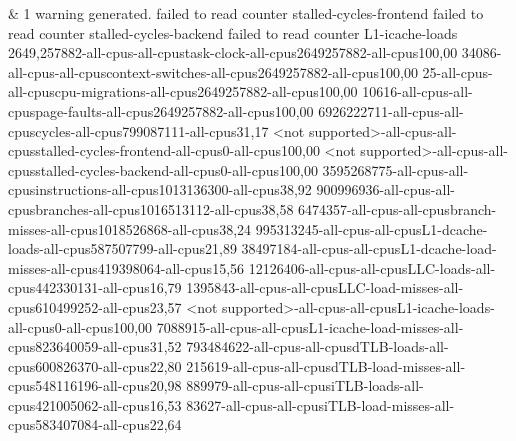 &
1 warning generated. failed to read counter stalled-cycles-frontend failed to read counter stalled-cycles-backend failed to read counter L1-icache-loads 2649,257882-all-cpus-all-cpustask-clock-all-cpus2649257882-all-cpus100,00 34086-all-cpus-all-cpuscontext-switches-all-cpus2649257882-all-cpus100,00 25-all-cpus-all-cpuscpu-migrations-all-cpus2649257882-all-cpus100,00 10616-all-cpus-all-cpuspage-faults-all-cpus2649257882-all-cpus100,00 6926222711-all-cpus-all-cpuscycles-all-cpus799087111-all-cpus31,17 <not supported>-all-cpus-all-cpusstalled-cycles-frontend-all-cpus0-all-cpus100,00 <not supported>-all-cpus-all-cpusstalled-cycles-backend-all-cpus0-all-cpus100,00 3595268775-all-cpus-all-cpusinstructions-all-cpus1013136300-all-cpus38,92 900996936-all-cpus-all-cpusbranches-all-cpus1016513112-all-cpus38,58 6474357-all-cpus-all-cpusbranch-misses-all-cpus1018526868-all-cpus38,24 995313245-all-cpus-all-cpusL1-dcache-loads-all-cpus587507799-all-cpus21,89 38497184-all-cpus-all-cpusL1-dcache-load-misses-all-cpus419398064-all-cpus15,56 12126406-all-cpus-all-cpusLLC-loads-all-cpus442330131-all-cpus16,79 1395843-all-cpus-all-cpusLLC-load-misses-all-cpus610499252-all-cpus23,57 <not supported>-all-cpus-all-cpusL1-icache-loads-all-cpus0-all-cpus100,00 7088915-all-cpus-all-cpusL1-icache-load-misses-all-cpus823640059-all-cpus31,52 793484622-all-cpus-all-cpusdTLB-loads-all-cpus600826370-all-cpus22,80 215619-all-cpus-all-cpusdTLB-load-misses-all-cpus548116196-all-cpus20,98 889979-all-cpus-all-cpusiTLB-loads-all-cpus421005062-all-cpus16,53 83627-all-cpus-all-cpusiTLB-load-misses-all-cpus583407084-all-cpus22,64
